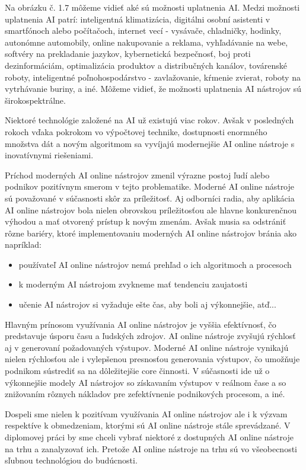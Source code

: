 Na obrázku č. 1.7 môžeme vidieť aké sú možnosti uplatnenia AI. Medzi možnosti uplatnenia AI patrí: inteligentná klimatizácia, digitálni osobní asistenti v smartfónoch alebo počítačoch, internet vecí - vysávače, chladničky, hodinky, autonómne automobily, online nakupovanie a reklama, vyhľadávanie na webe, softvéry na prekladanie jazykov, kybernetická bezpečnosť, boj proti dezinformáciám, optimalizácia produktov a distribučných kanálov, továrenské roboty, inteligentné poľnohospodárstvo - zavlažovanie, kŕmenie zvierat, roboty na vytrhávanie buriny, a iné.  Môžeme vidieť, že možnosti uplatnenia AI nástrojov sú širokospektrálne.\cite{eu_parliament_ai}
\par Niektoré technológie založené na AI už existujú viac rokov. Avšak v posledných rokoch vďaka pokrokom vo výpočtovej technike, dostupnosti enormného množstva dát a novým algoritmom sa vyvíjajú modernejšie AI online nástroje s inovatívnymi riešeniami. \cite{eu_parliament_ai}
\par Príchod moderných AI online nástrojov zmenil výrazne postoj ľudí alebo podnikov pozitívnym smerom v tejto problematike. Moderné AI online nástroje sú považované v súčasnosti skôr za príležitosť. Aj odborníci radia, aby aplikácia AI online nástrojov bola nielen obrovskou príležitosťou ale hlavne konkurenčnou výhodou a mať otvorený prístup k novým zmenám. \cite{removcikova_ai}  Avšak musia sa odstrániť rôzne bariéry, ktoré implementovaniu moderných AI online nástrojov bránia ako napríklad:

\begin{itemize}
    \item používateľ AI online nástrojov nemá prehľad o ich algoritmoch a procesoch
    \item k moderným AI nástrojom zvykneme mať tendenciu zaujatosti
    \item učenie AI nástrojov si vyžaduje ešte čas, aby boli aj výkonnejšie, atď... 
\end{itemize} 


Hlavným prínosom využívania AI online nástrojov je vyššia efektívnosť, čo predstavuje úsporu času a ľudských zdrojov.  AI online nástroje zvyšujú rýchlosť aj v generovaní požadovaných výstupov. Moderné AI online nástroje vynikajú nielen rýchlosťou ale i vylepšenou presnosťou generovania výstupov, čo umožňuje podnikom sústrediť sa na dôležitejšie core činnosti. \cite{deng2022} V súčasnosti ide už o výkonnejšie modely AI nástrojov so získavaním výstupov v reálnom čase a so znižovaním rôznych nákladov pre zefektívnenie podnikových procesom, a iné.
\par Dospeli sme nielen k pozitívam využívania AI online nástrojov ale i k výzvam respektíve k obmedzeniam, ktorými sú AI online nástroje stále sprevádzané. V diplomovej práci by sme chceli vybrať niektoré z dostupných AI online nástroje na trhu a zanalyzovať ich. Pretože AI online nástroje na trhu sú vo všeobecnosti sľubnou technológiou do budúcnosti.



